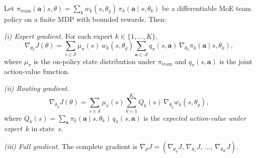 \begin{theorem}\label{thm:team-pgt}
Let $\pi_{\mathrm{team}}(\bm{a}\mid s,\theta)=\sum_k w_k(s,\theta_g)\,\pi_k(\bm{a}\mid s,\theta_k)$ be a differentiable MoE team policy on a finite MDP with bounded rewards. Then:

\medskip\noindent\emph{(i) Expert gradient.} For each expert $k\in\{1,\ldots,K\}$,
\begin{equation}\label{eq:expert-gradient}
  \nabla_{\theta_k} J(\theta) = \sum_{s\in\mathcal{S}} \mu_\pi(s)\, w_k(s,\theta_g) \sum_{\bm{a}\in\bm{\mathcal{A}}} q_\pi(s,\bm{a})\,\nabla_{\theta_k}\pi_k(\bm{a}\mid s,\theta_k),
\end{equation}
where $\mu_\pi$ is the on-policy state distribution under $\pi_{\mathrm{team}}$ and $q_\pi(s,\bm{a})$ is the joint action-value function.

\medskip\noindent\emph{(ii) Routing gradient.}
\begin{equation}\label{eq:routing-gradient}
  \nabla_{\theta_g} J(\theta) = \sum_{s\in\mathcal{S}} \mu_\pi(s) \sum_{k=1}^K Q_k(s)\,\nabla_{\theta_g} w_k(s,\theta_g),
\end{equation}
where $Q_k(s) = \sum_{\bm{a}} \pi_k(\bm{a}\mid s,\theta_k)\, q_\pi(s,\bm{a})$ is the \emph{expected action-value under expert~$k$} in state~$s$.

\medskip\noindent\emph{(iii) Full gradient.} The complete gradient is $\nabla_\theta J = (\nabla_{\theta_g}J,\,\nabla_{\theta_1}J,\,\ldots,\,\nabla_{\theta_K}J)$.
\end{theorem}

